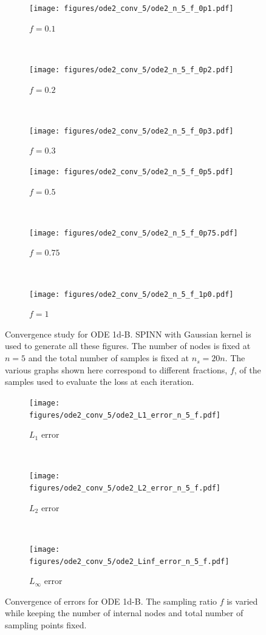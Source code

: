 \documentclass[12pt]{article}
\begin{document}
\begin{figure}
\begin{subfigure}{0.32\textwidth}
\centering
\texttt{[image: figures/ode2\_conv\_5/ode2\_n\_5\_f\_0p1.pdf]}
\caption{$f = 0.1$}
\label{fig:ode2_n_5_f_0p1}
\end{subfigure}
~
\begin{subfigure}{0.32\textwidth}
\centering
\texttt{[image: figures/ode2\_conv\_5/ode2\_n\_5\_f\_0p2.pdf]}
\caption{$f=0.2$}
\label{fig:ode2_n_5_f_0p2_a}
\end{subfigure}
~
\begin{subfigure}{0.32\textwidth}
\centering
\texttt{[image: figures/ode2\_conv\_5/ode2\_n\_5\_f\_0p3.pdf]}
\caption{$f=0.3$}
\label{fig:ode2_n_5_f_0p3}
\end{subfigure}
\begin{subfigure}{0.32\textwidth}
\centering
\texttt{[image: figures/ode2\_conv\_5/ode2\_n\_5\_f\_0p5.pdf]}
\caption{$f=0.5$}
\label{fig:ode2_n_5_0p5}
\end{subfigure}
~
\begin{subfigure}{0.32\textwidth}
\centering
\texttt{[image: figures/ode2\_conv\_5/ode2\_n\_5\_f\_0p75.pdf]}
\caption{$f=0.75$}
\label{fig:ode2_n_5_0p75}
\end{subfigure}
~
\begin{subfigure}{0.32\textwidth}
\centering
\texttt{[image: figures/ode2\_conv\_5/ode2\_n\_5\_f\_1p0.pdf]}
\caption{$f=1$}
\label{fig:ode2_n_5_1}
\end{subfigure}
\caption{Convergence study for ODE 1d-B. SPINN with Gaussian kernel is used to generate all these figures. The number of nodes is fixed at $n=5$ and the total number of samples is fixed at $n_s = 20n$. The various graphs shown here correspond to different fractions, $f$, of the samples used to evaluate the loss at each iteration.}
\label{fig:ode_1d_B_n_6_f}
\end{figure}

\begin{figure}
\begin{subfigure}{0.32\textwidth}
\centering
\texttt{[image: figures/ode2\_conv\_5/ode2\_L1\_error\_n\_5\_f.pdf]}
\caption{$L_1$ error}
\label{fig:ode2_n_5_L1}
\end{subfigure}
~
\begin{subfigure}{0.32\textwidth}
\centering
\texttt{[image: figures/ode2\_conv\_5/ode2\_L2\_error\_n\_5\_f.pdf]}
\caption{$L_2$ error}
\label{fig:ode2_n_5_L2}
\end{subfigure}
~
\begin{subfigure}{0.32\textwidth}
\centering
\texttt{[image: figures/ode2\_conv\_5/ode2\_Linf\_error\_n\_5\_f.pdf]}
\caption{$L_{\infty}$ error}
\label{fig:ode2_n_5_Linfa}
\end{subfigure}
\caption{Convergence of errors for ODE 1d-B. The sampling ratio $f$ is varied while keeping the number of internal nodes and total number of sampling points fixed.}
\label{fig:ode_1d_B_n_6_errors}
\end{figure}
\end{document}
